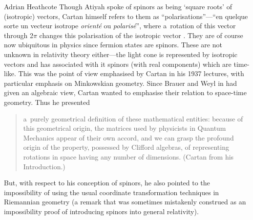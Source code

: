 \begin{artengenv}{Adrian Heathcote}
Though Atiyah spoke of spinors as being `square roots' of (isotropic) vectors, Cartan himself refers to them as ``polarisations''---``en quelque sorte un vecteur isotrope \textit{orienté} ou \textit{polarisé}'', where a~rotation of this vector through 2$\pi$ changes this polarisation of the isotropic vector \parencite[42]{cartan_theory_1966}. They are of course now ubiquitous in physics since fermion states are spinors. These are not unknown in relativity theory either---the light cone is represented by isotropic vectors and has associated with it spinors (with real components) which are time-like. This was the point of view emphasised by Cartan in his 1937 lectures, with particular emphasis on Minkowskian geometry. Since Brauer and Weyl in \parencite*{brauer_spinors_1935} had given an algebraic view, Cartan wanted to emphasise their relation to space-time geometry. Thus he presented 
\begin{quotation}\noindent
[\ldots] a~purely geometrical definition of these mathematical entities: because of this geometrical origin, the matrices used by physicists in Quantum Mechanics appear of their own accord, and we can grasp the profound origin of the property, possessed by Clifford algebras, of representing rotations in space having any number of dimensions. (Cartan \parencite*{cartan_theory_1966} from his Introduction.)
\end{quotation}
But, with respect to his conception of spinors, he also pointed to the impossibility of using the usual coordinate transformation techniques in Riemannian geometry (a remark that was sometimes mistakenly construed as an impossibility proof of introducing spinors into general relativity).


\end{artengenv}
